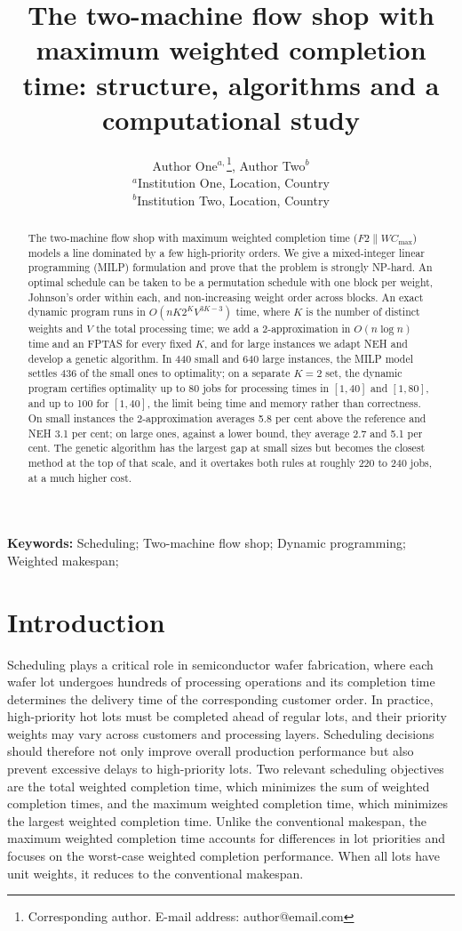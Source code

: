 ﻿\documentclass[12pt]{article}
\title{\LARGE\bf The two-machine flow shop with maximum weighted completion time: structure,
algorithms and a computational study}
\author{Author One$^{a,}$\footnote{Corresponding author. E-mail address: author@email.com}, Author Two$^{b}$\\
{\small $^{a}$Institution One, Location, Country}\\
{\small $^{b}$Institution Two, Location, Country}\\}
\date{}
\let\origsection\section
\renewcommand{\section}{\FloatBarrier\origsection}
\begin{document}
\begin{sloppypar}

\maketitle

\begin{abstract}
    The two-machine flow shop with maximum weighted completion time ($F2 \parallel WC_{\max}$)
    models a line dominated by a few high-priority orders. We give a mixed-integer linear
    programming (MILP) formulation and prove that the problem is strongly NP-hard. An optimal
    schedule can be taken to be a permutation schedule with one block per weight, Johnson's order
    within each, and non-increasing weight order across blocks. An exact dynamic program runs in
    $O(nK2^{K}V^{3K-3})$ time, where $K$ is the number of distinct weights and $V$ the total
    processing time; we add a 2-approximation in $O(n\log n)$ time and an FPTAS for every fixed
    $K$, and for large instances we adapt NEH and develop a genetic algorithm. In 440 small and
    640 large instances, the MILP model settles 436 of the small ones to optimality; on a separate
    $K=2$ set, the dynamic program certifies optimality up to 80 jobs for processing times in
    $[1,40]$ and $[1,80]$, and up to 100 for $[1,40]$, the limit being time and memory rather than
    correctness. On small instances the 2-approximation averages 5.8 per cent above the reference
    and NEH 3.1 per cent; on large ones, against a lower bound, they average 2.7 and 5.1 per cent.
    The genetic algorithm has the largest gap at small sizes but becomes the closest method at the
    top of that scale, and it overtakes both rules at roughly 220 to 240 jobs, at a much higher
    cost.
\end{abstract}

\noindent \textbf{Keywords:} Scheduling; Two-machine flow shop; Dynamic programming; Weighted makespan; 

\section{Introduction}
\label{sec:intro}

Scheduling plays a critical role in semiconductor wafer fabrication, where each wafer lot
undergoes hundreds of processing operations and its completion time determines the delivery
time of the corresponding customer order. In practice, high-priority hot lots must be completed
ahead of regular lots, and their priority weights may vary across customers and processing
layers. Scheduling decisions should therefore not only improve overall production performance
but also prevent excessive delays to high-priority lots. Two relevant scheduling objectives are
the total weighted completion time, which minimizes the sum of weighted completion times,
and the maximum weighted completion time, which minimizes the largest weighted completion
time. Unlike the conventional makespan, the maximum weighted completion time accounts for
differences in lot priorities and focuses on the worst-case weighted completion performance.
When all lots have unit weights, it reduces to the conventional makespan.


\end{sloppypar}
\end{document}
